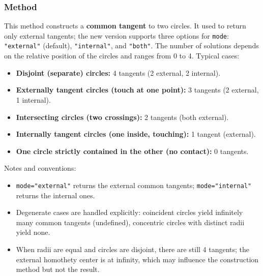 \begin{tkzexample}[latex = .5\textwidth]
\begin{center}
\end{center}
\end{tkzexample}


\subsubsection{Method }
\label{ssub:common_tangent}

This method constructs a \textbf{common tangent} to two circles.
It used to return only external tangents; the new version supports three options for \verb|mode|:
\verb|"external"| (default), \verb|"internal"|, and \verb|"both"|.
The number of solutions depends on the relative position of the circles and ranges from 0 to 4.
\medskip
\noindent
Typical cases:
\begin{itemize}
\small
\item \textbf{Disjoint (separate) circles:} 4 tangents (2 external, 2 internal).
\item \textbf{Externally tangent circles (touch at one point):} 3 tangents (2 external, 1 internal).
\item \textbf{Intersecting circles (two crossings):} 2 tangents (both external).
\item \textbf{Internally tangent circles (one inside, touching):} 1 tangent (external).
\item \textbf{One circle strictly contained in the other (no contact):} 0 tangents.
\end{itemize}
\noindent
Notes and conventions:
\begin{itemize}
\item \verb|mode="external"| returns the external common tangents; \verb|mode="internal"| returns the internal ones.
\item Degenerate cases are handled explicitly: coincident circles yield infinitely many common tangents (undefined), concentric circles with distinct radii yield none.
\item When radii are equal and circles are disjoint, there are still 4 tangents; the external homothety center is at infinity, which may influence the construction method but not the result.
\end{itemize}

